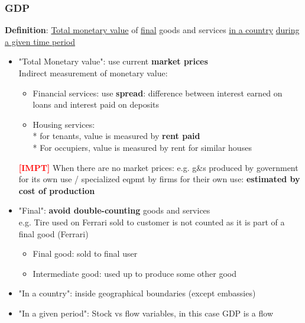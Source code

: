 \documentclass{article}
\newcommand{\impt}[0]{\textcolor{red}{\textbf{[IMPT] }}}
\begin{document}
\begin{multicols}{2}
\subsubsection{GDP}
\textbf{Definition}: \underline{Total monetary value} of \underline{final} goods and services \underline{in a country} \underline{during a given time period}
\begin{itemize}
	\item "Total Monetary value": use current \textbf{market prices}\\
	Indirect measurement of monetary value:
	\begin{itemize}
		\item Financial services: use \textbf{spread}: difference between interest earned on loans and interest paid on deposits
		\item Housing services:\\
		* for tenants, value is measured by \textbf{rent paid}\\
		* For occupiers, value is measured by rent for similar houses
	\end{itemize}
\impt When there are no market prices: e.g. g\&s produced by government for its own use / specialized eqpmt by firms for their own use:
\textbf{estimated by cost of production}
	\item "Final": \textbf{avoid double-counting} goods and services\\
	e.g. Tire used on Ferrari sold to customer is not counted as it is part of a final good (Ferrari)
	\begin{itemize}
		\item Final good: sold to final user
		\item Intermediate good: used up to produce some other good
	\end{itemize}
\item "In a country": inside geographical boundaries (except embassies)
\item "In a given period": Stock vs flow variables, in this case GDP is a flow
\end{itemize}

\end{multicols}
\end{document}
